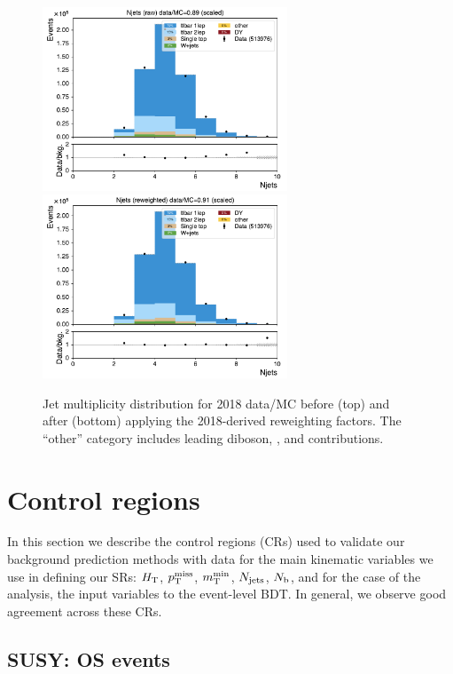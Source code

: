 \begin{figure}[h!]
\centering
\includegraphics[width=0.65\textwidth]{figs/ftan/isr/njets_raw.pdf} \\
\includegraphics[width=0.65\textwidth]{figs/ftan/isr/njets_corr.pdf}
\caption{
    Jet multiplicity distribution for 2018 data/MC before (top) and after (bottom)
    applying the 2018-derived reweighting factors. The ``other'' category includes
    leading diboson, \ttW, and \ttZ contributions.
}
\label{fig:isrweightsyst}
\end{figure}


\FloatBarrier

\section{Control regions}

In this section we describe the control regions (CRs) used to validate our background
prediction methods with data for the main kinematic variables
we use in defining our SRs: $H_{\mathrm{T}}$, $p_{\mathrm{T}}^\text{miss}$, $m_{\mathrm{T}}^{\text{min}}$,
$N_\text{jets}$, $N_\mathrm{b}$, and for the case of the \smft analysis, the input variables
to the event-level BDT. In general, we observe good agreement across these CRs.


\subsection{SUSY: OS events}

